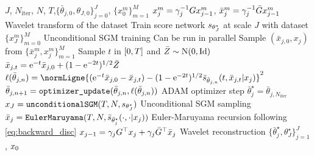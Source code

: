 \documentclass{article}
\begin{document}
\begin{algorithm}[!h]
\caption{\small Wavelet Score-based Generative Model}
\label{alg:cascaded_wavelet}
\begin{algorithmic}[1]
  \small
  \Require $J$, $N_{\textrm{iter}}$, $N$, $T$,$\{\bar\theta_{j,0}, \theta_{J, 0}\}_{j=0}^{J}$, $\{x^m_0\}_{m=1}^M$
  \State{\color{commentcolor}{/// WAVELET TRANSFORM ///}}
  \State $x_{j}^m = \gamma_j^{-1} G x_{j-1}^m$,  $\bar{x}_{j}^m =  \gamma_j^{-1} \bar{G} x_{j-1}^m$ \Comment Wavelet transform of the dataset
  \EndFor
  \EndFor
  \State{\color{commentcolor}{/// TRAINING ///}}
  \State Train score network ${s}_{\theta^\star_{J}}$ at scale $J$ with dataset $\{ x_{J}^m\}_{m=0}^M$ \Comment Unconditional SGM training
 \Comment Can be run in parallel
\State Sample $(\bar{x}_{j,0}, x_{j})$ from $\{\bar{x}_j^m, x_{j}^m\}_{m=1}^M$ 
\State Sample $t$ in $\left[0, T\right]$ and $\bar{Z} \sim \mathrm{N}(0, \operatorname{Id})$
\State $\bar{x}_{j,t} = \mathrm{e}^{-t} \bar{x}_{j,0} + (1 - \mathrm{e}^{-2t})^{1/2} \bar{Z}$ 
\State $\ell(\bar\theta_{j,n}) = \normLigne{(\rme^{-t}\bar{x}_{j,0} - \bar{x}_{j,t}) - (1 - \rme^{-2t})^{1/2} \bar\bs_{\bar\theta_{j,n}}(t, \bar{x}_{j,t} | x_{j})}^2$ 
\State $\bar\theta_{j,n+1} = \verb|optimizer_update|(\bar\theta_{j,n}, \ell(\bar\theta_{j,n}))$ \Comment ADAM optimizer step %
\EndFor
\State $\bar\theta^\star_j = \bar\theta_{j, N_{\textrm{iter}}}$
\EndFor
\State{\color{commentcolor}{/// SAMPLING ///}}
\State ${\txwav}_{J} = \verb|unconditionalSGM|(T, N, \bs_{\theta_J^\star})$ \Comment Unconditional SGM sampling
\State $\tox_{j} = \verb|EulerMaruyama|(T, N, \bar\bs_{\bar\theta_j^\star}(\cdot, \cdot | \txwav_{j}))$ \Comment
Euler-Maruyama recursion following \eqref{eq:backward_disc}
\State $x_{j-1} = \gamma_j G^\top x_{j} + \gamma_j \bar{G}^\top {\bar x}_{j}$ \Comment Wavelet reconstruction
\EndFor
{} $\{\bar\theta^\star_{j}, \theta^\star_J\}_{j=1}^{J}$, $x_{0}$
\end{algorithmic}
\end{algorithm}
\end{document}
